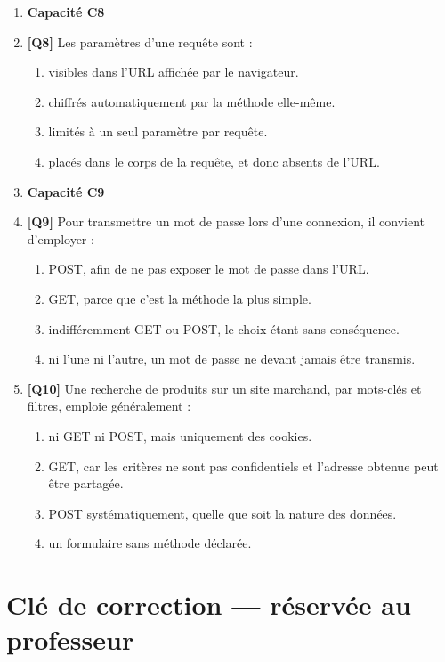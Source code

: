\begin{enumerate}
\item[] \textbf{Capacité C8}

\item \textbf{[Q8]} Les paramètres d'une requête  sont :
  \begin{enumerate}[label=\Alph*.]
    \item visibles dans l'URL affichée par le navigateur.
    \item chiffrés automatiquement par la méthode elle-même.
    \item limités à un seul paramètre par requête.
    \item placés dans le corps de la requête, et donc absents de l'URL.
  \end{enumerate}

\item[] \textbf{Capacité C9}

\item \textbf{[Q9]} Pour transmettre un mot de passe lors d'une connexion, il convient d'employer :
  \begin{enumerate}[label=\Alph*.]
    \item POST, afin de ne pas exposer le mot de passe dans l'URL.
    \item GET, parce que c'est la méthode la plus simple.
    \item indifféremment GET ou POST, le choix étant sans conséquence.
    \item ni l'une ni l'autre, un mot de passe ne devant jamais être transmis.
  \end{enumerate}

\item \textbf{[Q10]} Une recherche de produits sur un site marchand, par mots-clés et filtres, emploie généralement :
  \begin{enumerate}[label=\Alph*.]
    \item ni GET ni POST, mais uniquement des cookies.
    \item GET, car les critères ne sont pas confidentiels et l'adresse obtenue peut être partagée.
    \item POST systématiquement, quelle que soit la nature des données.
    \item un formulaire sans méthode déclarée.
  \end{enumerate}

\end{enumerate}

\ifnxVersionProfesseur
\clearpage
\section*{Clé de correction — réservée au professeur}

